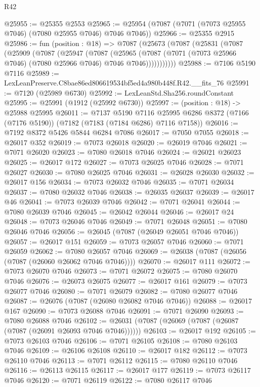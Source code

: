 \begin{lexlean}{R42}
\begin{coremodule}
{@25955 := @25355 @2553
@25965 := @25954 (@7087 (@7071 (@7073 @25955 @7046) (@7080 @25955 @7046) @7046 @7046))
@25966 := @25355 @2915
@25986 := fun (position : @18) =>
  @7087
    (@25673
      (@7087
        (@25831
          (@7087
            (@25909
              (@7087
                (@25947
                  (@7087
                    (@25965
                      (@7087 (@7071 (@7073 @25966 @7046) (@7080 @25966 @7046) @7046 @7046)))))))))))
@25988 := @7106 @5190 @7116
@25989 := LexLeanPreserve.C8bae86ed806619534bf5ed4a980b448f.R42.__fits_76
@25991 := @7120 (@25989 @6730)
@25992 := LexLeanStd.Sha256.roundConstant
@25995 := @25991 (@1912 (@25992 @6730))
@25997 := (position : @18) -> @25988 @25995
@26011 := @7137
    @5190
    @7116
    @25995
    @6286
    @8372
    (@7166 (@7176 @5190))
    (@7182 (@7183 (@7184 @6286) @7116 @7158))
@26016 := @7192 @8372 @5426 @5844 @6284 @7086
@26017 := @7050 @7055
@26018 := @26017 @352
@26019 := @7073 @26018
@26020 := @26019 @7046
@26021 := @7071 @26020
@26023 := @7080 @26018 @7046
@26024 := @26021 @26023
@26025 := @26017 @172
@26027 := @7073 @26025 @7046
@26028 := @7071 @26027
@26030 := @7080 @26025 @7046
@26031 := @26028 @26030
@26032 := @26017 @156
@26034 := @7073 @26032 @7046
@26035 := @7071 @26034
@26037 := @7080 @26032 @7046
@26038 := @26035 @26037
@26039 := @26017 @46
@26041 := @7073 @26039 @7046
@26042 := @7071 @26041
@26044 := @7080 @26039 @7046
@26045 := @26042 @26044
@26046 := @26017 @24
@26048 := @7073 @26046 @7046
@26049 := @7071 @26048
@26051 := @7080 @26046 @7046
@26056 := @26045 (@7087 (@26049 @26051 @7046 @7046))
@26057 := @26017 @151
@26059 := @7073 @26057 @7046
@26060 := @7071 @26059
@26062 := @7080 @26057 @7046
@26069 := @26038 (@7087 (@26056 (@7087 (@26060 @26062 @7046 @7046))))
@26070 := @26017 @111
@26072 := @7073 @26070 @7046
@26073 := @7071 @26072
@26075 := @7080 @26070 @7046
@26076 := @26073 @26075
@26077 := @26017 @161
@26079 := @7073 @26077 @7046
@26080 := @7071 @26079
@26082 := @7080 @26077 @7046
@26087 := @26076 (@7087 (@26080 @26082 @7046 @7046))
@26088 := @26017 @167
@26090 := @7073 @26088 @7046
@26091 := @7071 @26090
@26093 := @7080 @26088 @7046
@26102 := @26031 (@7087 (@26069 (@7087 (@26087 (@7087 (@26091 @26093 @7046 @7046))))))
@26103 := @26017 @192
@26105 := @7073 @26103 @7046
@26106 := @7071 @26105
@26108 := @7080 @26103 @7046
@26109 := @26106 @26108
@26110 := @26017 @182
@26112 := @7073 @26110 @7046
@26113 := @7071 @26112
@26115 := @7080 @26110 @7046
@26116 := @26113 @26115
@26117 := @26017 @177
@26119 := @7073 @26117 @7046
@26120 := @7071 @26119
@26122 := @7080 @26117 @7046
}
\end{coremodule}
\end{lexlean}
